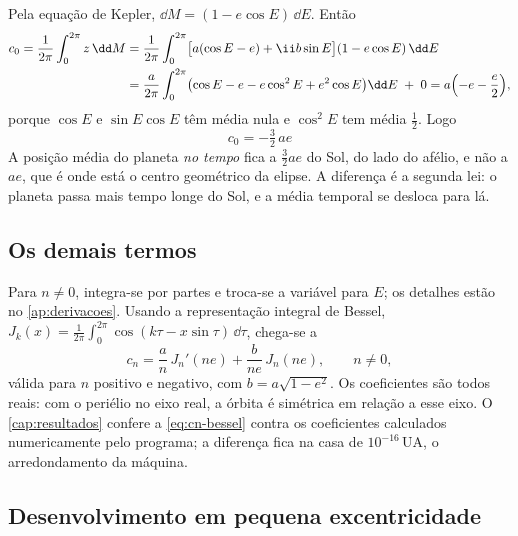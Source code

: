 Pela equação de Kepler, $\dd M = (1 - e\cos E)\,\dd E$. Então
\begin{align}
  c_0 = \frac{1}{2\pi}\int_0^{2\pi} z\,\dd M
  &= \frac{1}{2\pi}\int_0^{2\pi}\bigl[a(\cos E - e) + \ii b\sin E\bigr](1-e\cos E)\,\dd E \nonumber\\
  &= \frac{a}{2\pi}\int_0^{2\pi}\bigl(\cos E - e - e\cos^2E + e^2\cos E\bigr)\dd E \;+\; 0
   = a\Bigl(-e - \frac{e}{2}\Bigr),
\end{align}
porque $\cos E$ e $\sin E\cos E$ têm média nula e $\cos^2E$ tem média $\tfrac12$. Logo
\begin{equation}
  \boxed{\;c_0 = -\tfrac{3}{2}\,a e\;}
  \label{eq:c0}
\end{equation}
A posição média do planeta \emph{no tempo} fica a $\tfrac32 ae$ do Sol, do lado do afélio, e não a $ae$, que é onde está o centro geométrico da elipse. A diferença é a segunda lei: o planeta passa mais tempo longe do Sol, e a média temporal se desloca para lá.

\subsection{Os demais termos}

Para $n\neq0$, integra-se por partes e troca-se a variável para $E$; os detalhes estão no \autoref{ap:derivacoes}. Usando a representação integral de Bessel, $J_k(x) = \frac{1}{2\pi}\int_0^{2\pi}\cos(k\tau - x\sin\tau)\,\dd\tau$, chega-se a
\begin{equation}
  \boxed{\;c_n = \frac{a}{n}\,J_n'(ne) + \frac{b}{ne}\,J_n(ne),\qquad n\neq 0,\;}
  \label{eq:cn-bessel}
\end{equation}
válida para $n$ positivo e negativo, com $b = a\sqrt{1-e^2}$. Os coeficientes são todos reais: com o periélio no eixo real, a órbita é simétrica em relação a esse eixo. O \autoref{cap:resultados} confere a \autoref{eq:cn-bessel} contra os coeficientes calculados numericamente pelo programa; a diferença fica na casa de $10^{-16}$\,UA, o arredondamento da máquina.

\subsection{Desenvolvimento em pequena excentricidade}\label{sec:pequeno-e}

